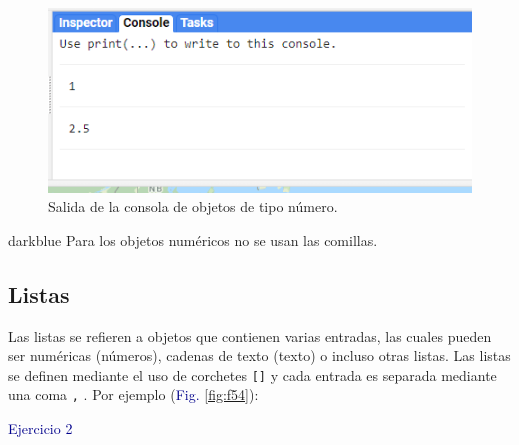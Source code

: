\documentclass[
  12pt,
  letterpaper,
  twoside]{book}
\begin{document}
\begin{figure}[H]

{\centering \includegraphics[width=0.95\linewidth]{Img/ej1} 

}

\caption{Salida de la consola de objetos de tipo número.}\label{fig:f53}
\end{figure}

\begin{bluebox2}

\begin{awesomeblock}{5pt}{\faLightbulb}{darkblue}
Para los objetos numéricos no se usan las comillas.

\end{awesomeblock}

\end{bluebox2}

\hypertarget{listas}{%
\subsection*{Listas}\label{listas}}

Las listas se refieren a objetos que contienen varias entradas, las cuales pueden ser numéricas (números), cadenas de texto (texto) o incluso otras listas. Las listas se definen mediante el uso de corchetes \texttt{{[}{]}} y cada entrada es separada mediante una coma \texttt{,} . Por ejemplo (\textcolor{darkblue}{Fig.} \ref{fig:f54}):

\textcolor{darkblue}{Ejercicio 2}
\end{document}
